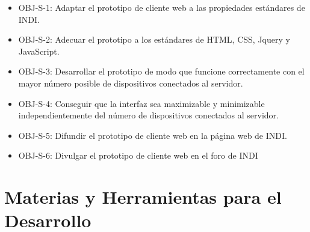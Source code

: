 \begin{itemize}
  \item OBJ-S-1: Adaptar el prototipo de cliente web a las propiedades estándares de INDI.
  \item OBJ-S-2: Adecuar el prototipo a los estándares de HTML, CSS, Jquery y JavaScript.
  \item OBJ-S-3: Desarrollar el prototipo de modo que funcione correctamente con el mayor número posible de dispositivos conectados al servidor.
  \item OBJ-S-4: Conseguir que la interfaz sea maximizable y minimizable independientemente del número de dispositivos conectados al servidor.
  \item OBJ-S-5: Difundir el prototipo de cliente web en la página web de INDI.
  \item OBJ-S-6: Divulgar el prototipo de cliente web en el foro de INDI
\end{itemize}

\section{Materias y Herramientas para el Desarrollo}
